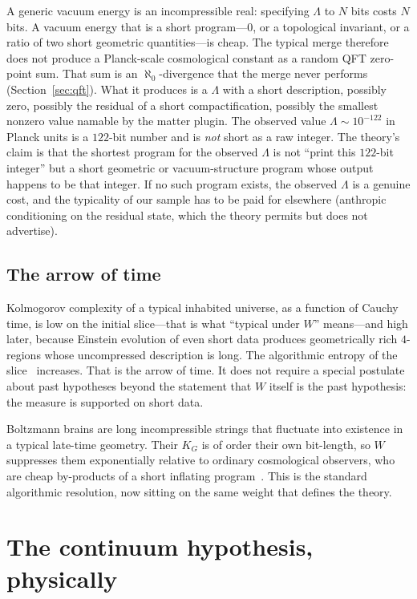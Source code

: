 \documentclass[11pt,a4paper]{article}
\theoremstyle{plain}
\theoremstyle{definition}
\theoremstyle{remark}
\newcommand{\alef}{\aleph_{0}}
\newcommand{\KG}{K_{G}}
\begin{document}
A generic vacuum energy is an incompressible real: specifying $\Lambda$ to $N$ bits costs $N$ bits.
A vacuum energy that is a short program---$0$, or a topological invariant, or a ratio of two short geometric quantities---is cheap.
The typical merge therefore does not produce a Planck-scale cosmological constant as a random QFT zero-point sum.
That sum is an $\alef$-divergence that the merge never performs (Section~\ref{sec:qft}).
What it produces is a $\Lambda$ with a short description, possibly zero, possibly the residual of a short compactification, possibly the smallest nonzero value namable by the matter plugin.
The observed value $\Lambda\sim 10^{-122}$ in Planck units is a $122$-bit number and is \emph{not} short as a raw integer.
The theory's claim is that the shortest program for the observed $\Lambda$ is not ``print this $122$-bit integer'' but a short geometric or vacuum-structure program whose output happens to be that integer.
If no such program exists, the observed $\Lambda$ is a genuine cost, and the typicality of our sample has to be paid for elsewhere (anthropic conditioning on the residual state, which the theory permits but does not advertise).

\subsection{The arrow of time}

Kolmogorov complexity of a typical inhabited universe, as a function of Cauchy time, is low on the initial slice---that is what ``typical under $W$'' means---and high later, because Einstein evolution of even short data produces geometrically rich $4$-regions whose uncompressed description is long.
The algorithmic entropy of the slice~\cite{zurek1989} increases.
That is the arrow of time.
It does not require a special postulate about past hypotheses beyond the statement that $W$ itself is the past hypothesis: the measure is supported on short data.

Boltzmann brains are long incompressible strings that fluctuate into existence in a typical late-time geometry.
Their $\KG$ is of order their own bit-length, so $W$ suppresses them exponentially relative to ordinary cosmological observers, who are cheap by-products of a short inflating program~\cite{carroll2017}.
This is the standard algorithmic resolution, now sitting on the same weight that defines the theory.

\section{The continuum hypothesis, physically}
\label{sec:ch}
\end{document}
